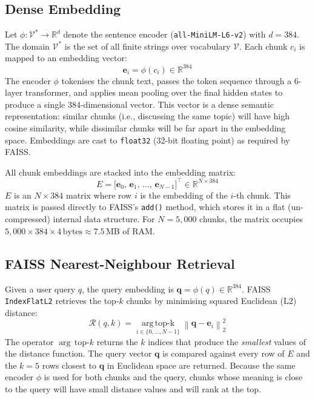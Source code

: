 \documentclass[conference]{IEEEtran}
\begin{document}
\subsection{Dense Embedding}
Let $\phi : \mathcal{V}^{*} \rightarrow \mathbb{R}^{d}$ denote the
sentence encoder (\texttt{all-MiniLM-L6-v2}) with $d=384$.
The domain $\mathcal{V}^{*}$ is the set of all finite strings over
vocabulary $\mathcal{V}$.
Each chunk $c_i$ is mapped to an embedding vector:
\begin{equation}
  \mathbf{e}_i = \phi(c_i) \in \mathbb{R}^{384}
  \label{eq:embed}
\end{equation}
The encoder $\phi$ tokenises the chunk text, passes the token sequence
through a 6-layer transformer, and applies mean pooling over the final
hidden states to produce a single 384-dimensional vector.
This vector is a dense semantic representation: similar chunks
(i.e., discussing the same topic) will have high cosine similarity,
while dissimilar chunks will be far apart in the embedding space.
Embeddings are cast to \texttt{float32} (32-bit floating point) as
required by FAISS.

All chunk embeddings are stacked into the embedding matrix:
\begin{equation}
  E = \bigl[\mathbf{e}_0,\, \mathbf{e}_1,\, \ldots,\,
            \mathbf{e}_{N-1}\bigr]^{\!\top} \in \mathbb{R}^{N \times 384}
  \label{eq:embmat}
\end{equation}
$E$ is an $N \times 384$ matrix where row $i$ is the embedding of the
$i$-th chunk.
This matrix is passed directly to FAISS's \texttt{add()} method, which
stores it in a flat (un-compressed) internal data structure.
For $N=5{,}000$ chunks, the matrix occupies
$5{,}000 \times 384 \times 4\,\mathrm{bytes} \approx 7.5$\,MB of RAM.

\subsection{FAISS Nearest-Neighbour Retrieval}
Given a user query $q$, the query embedding is
$\mathbf{q} = \phi(q) \in \mathbb{R}^{384}$.
FAISS \texttt{IndexFlatL2} retrieves the top-$k$ chunks by minimising
squared Euclidean (L2) distance:
\begin{equation}
  \mathcal{R}(q,k) =
  \operatorname*{arg\,top\text{-}k}_{i \in \{0,\ldots,N-1\}}
  \left\|\mathbf{q} - \mathbf{e}_i\right\|_2^2
  \label{eq:retrieval}
\end{equation}
The operator $\arg\,\mathrm{top}\text{-}k$ returns the $k$ indices
that produce the \emph{smallest} values of the distance function.
The query vector $\mathbf{q}$ is compared against every row of $E$ and
the $k=5$ rows closest to $\mathbf{q}$ in Euclidean space are
returned.
Because the same encoder $\phi$ is used for both chunks and the query,
chunks whose meaning is close to the query will have small distance
values and will rank at the top.
\end{document}

